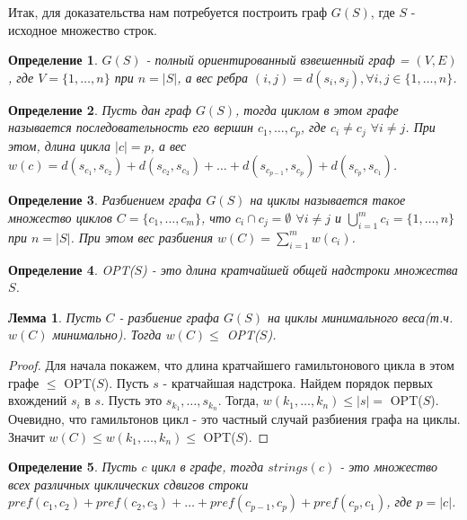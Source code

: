 \documentclass[a4paper,10pt]{article}
\newtheorem{lemma}{Лемма}
\newtheorem{definition}{Определение}
\begin{document}
Итак, для доказательства нам потребуется построить граф $G(S)$, где $S$ - исходное множество строк. 

\begin{definition}
$G(S)$ - полный ориентированный взвешенный граф = $(V, E)$, где $V = \{ 1, \dots, n \}$ при $n = |S|$, а вес ребра $(i, j) = d(s_i, s_j), \forall i,j \in \{ 1, \dots, n \}$.
\end{definition}

\begin{definition}
Пусть дан граф $G(S)$, тогда циклом в этом графе называется последовательность его вершин $c_1, \dots, c_p$, где $c_i \ne c_j$ $\forall i \ne j$.
При этом, длина цикла $|c| = p$, а вес $w(c) = d(s_{c_1}, s_{c_2}) + d(s_{c_2}, s_{c_3}) + \dots + d(s_{c_{p-1}}, s_{c_p}) + d(s_{c_p}, s_{c_1})$.
\end{definition}

\begin{definition}
Разбиением графа $G(S)$ на циклы называется такое множество циклов $C = \{ c_1, \dots, c_m \}$, 
что $c_i \cap c_j = \emptyset$ $\forall i \ne j$ и $\bigcup\limits_{i=1}^m c_i = \{ 1, \dots, n \}$ при $n = |S|$.
При этом вес разбиения $w(C) = \sum\limits_{i=1}^m w(c_i)$.
\end{definition}

\begin{definition}
OPT($S$) - это длина кратчайшей общей надстроки множества $S$.
\end{definition}

\begin{lemma}
Пусть $C$ - разбиение графа $G(S)$ на циклы минимального веса(т.ч. $w(C)$ минимально).
Тогда $w(C) \leq$ OPT($S$).
\end{lemma}

\begin{proof}
Для начала покажем, что длина кратчайшего гамильтонового цикла в этом графе $\leq$ OPT($S$).
Пусть $s$ - кратчайшая надстрока. Найдем порядок первых вхождений $s_i$ в $s$. Пусть это $s_{k_1}, \dots, s_{k_n}$.
Тогда, $w(k_1, \dots, k_n) \leq |s| =$ OPT($S$). Очевидно, что гамильтонов цикл - это частный случай разбиения графа на циклы.
Значит $w(C) \leq w(k_1, \dots, k_n) \leq$ OPT($S$).
\end{proof}

\begin{definition}
Пусть $c$ цикл в графе, тогда $strings(c)$ - это множество всех различных циклических сдвигов строки 
$pref(c_1, c_2)+pref(c_2, c_3)+\dots+pref(c_{p-1}, c_p)+pref(c_p, c_1)$, где $p = |c|$.
\end{definition}
\end{document}

